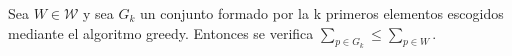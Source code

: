 




\begin{lemma}
    Sea $W \in \mathcal W$ y sea $G_k$ un conjunto formado
    por la k primeros elementos escogidos mediante el algoritmo greedy. 
    Entonces se verifica $\sum_{p \in G_k} \leq \sum_{p \in W}$. 
\end{lemma}

